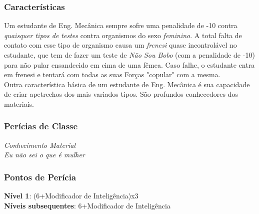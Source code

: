 \documentclass[ letterpaper,12pt]{article}
\begin{document}
\subsubsection{Características}
Um estudante de Eng. Mecânica sempre sofre uma penalidade de -10 contra {\it quaisquer tipos de testes} contra organismos do sexo {\it feminino}. A total falta de contato com esse tipo de organismo causa um {\it frenesi} quase incontrolável no estudante, que tem de fazer um teste de {\it Não Sou Bobo} (com a penalidade de -10) para não pular ensandecido em cima de uma fêmea. Caso falhe, o estudante entra em frenesi e tentará com todas as suas Forças "copular" com a mesma.\\
Outra característica básica de um estudante de Eng. Mecânica é sua capacidade de criar apetrechos dos mais variados tipos. São profundos conhecedores dos materiais.\\

\subsubsection{Perícias de Classe}
{\it Conhecimento Material\\
Eu não sei o que é mulher}\\

\subsubsection{Pontos de Perícia}
{\bf Nível 1}: (6+Modificador de Inteligência)x3\\
{\bf Níveis subsequentes}: 6+Modificador de Inteligência\\
\end{document}
